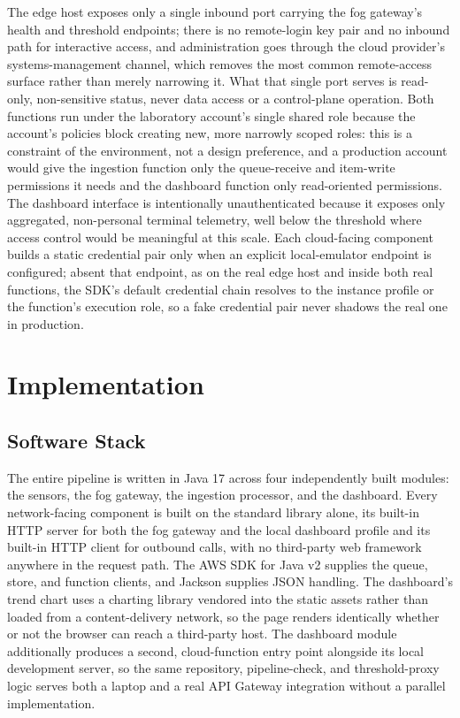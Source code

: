 \documentclass[conference]{IEEEtran}
\begin{document}
The edge host exposes only a single inbound port carrying the fog gateway's health and threshold endpoints; there is no remote-login key pair and no inbound path for interactive access, and administration goes through the cloud provider's systems-management channel, which removes the most common remote-access surface rather than merely narrowing it. What that single port serves is read-only, non-sensitive status, never data access or a control-plane operation. Both functions run under the laboratory account's single shared role because the account's policies block creating new, more narrowly scoped roles: this is a constraint of the environment, not a design preference, and a production account would give the ingestion function only the queue-receive and item-write permissions it needs and the dashboard function only read-oriented permissions. The dashboard interface is intentionally unauthenticated because it exposes only aggregated, non-personal terminal telemetry, well below the threshold where access control would be meaningful at this scale. Each cloud-facing component builds a static credential pair only when an explicit local-emulator endpoint is configured; absent that endpoint, as on the real edge host and inside both real functions, the SDK's default credential chain resolves to the instance profile or the function's execution role, so a fake credential pair never shadows the real one in production.

\section{Implementation}

\subsection{Software Stack}

The entire pipeline is written in Java 17 across four independently built modules: the sensors, the fog gateway, the ingestion processor, and the dashboard. Every network-facing component is built on the standard library alone, its built-in HTTP server for both the fog gateway and the local dashboard profile and its built-in HTTP client for outbound calls, with no third-party web framework anywhere in the request path. The AWS SDK for Java v2 supplies the queue, store, and function clients, and Jackson supplies JSON handling. The dashboard's trend chart uses a charting library vendored into the static assets rather than loaded from a content-delivery network, so the page renders identically whether or not the browser can reach a third-party host. The dashboard module additionally produces a second, cloud-function entry point alongside its local development server, so the same repository, pipeline-check, and threshold-proxy logic serves both a laptop and a real API Gateway integration without a parallel implementation.
\end{document}
